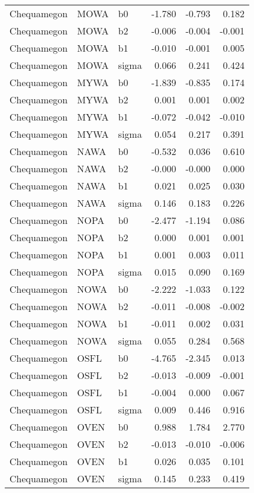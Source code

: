 \begin{table}[ht]
\begin{center}
\begin{tabular}{lllrrr}
  Chequamegon & MOWA & b0 & -1.780 & -0.793 & 0.182 \\ 
  Chequamegon & MOWA & b2 & -0.006 & -0.004 & -0.001 \\ 
  Chequamegon & MOWA & b1 & -0.010 & -0.001 & 0.005 \\ 
  Chequamegon & MOWA & sigma & 0.066 & 0.241 & 0.424 \\ 
  Chequamegon & MYWA & b0 & -1.839 & -0.835 & 0.174 \\ 
  Chequamegon & MYWA & b2 & 0.001 & 0.001 & 0.002 \\ 
  Chequamegon & MYWA & b1 & -0.072 & -0.042 & -0.010 \\ 
  Chequamegon & MYWA & sigma & 0.054 & 0.217 & 0.391 \\ 
  Chequamegon & NAWA & b0 & -0.532 & 0.036 & 0.610 \\ 
  Chequamegon & NAWA & b2 & -0.000 & -0.000 & 0.000 \\ 
  Chequamegon & NAWA & b1 & 0.021 & 0.025 & 0.030 \\ 
  Chequamegon & NAWA & sigma & 0.146 & 0.183 & 0.226 \\ 
  Chequamegon & NOPA & b0 & -2.477 & -1.194 & 0.086 \\ 
  Chequamegon & NOPA & b2 & 0.000 & 0.001 & 0.001 \\ 
  Chequamegon & NOPA & b1 & 0.001 & 0.003 & 0.011 \\ 
  Chequamegon & NOPA & sigma & 0.015 & 0.090 & 0.169 \\ 
  Chequamegon & NOWA & b0 & -2.222 & -1.033 & 0.122 \\ 
  Chequamegon & NOWA & b2 & -0.011 & -0.008 & -0.002 \\ 
  Chequamegon & NOWA & b1 & -0.011 & 0.002 & 0.031 \\ 
  Chequamegon & NOWA & sigma & 0.055 & 0.284 & 0.568 \\ 
  Chequamegon & OSFL & b0 & -4.765 & -2.345 & 0.013 \\ 
  Chequamegon & OSFL & b2 & -0.013 & -0.009 & -0.001 \\ 
  Chequamegon & OSFL & b1 & -0.004 & 0.000 & 0.067 \\ 
  Chequamegon & OSFL & sigma & 0.009 & 0.446 & 0.916 \\ 
  Chequamegon & OVEN & b0 & 0.988 & 1.784 & 2.770 \\ 
  Chequamegon & OVEN & b2 & -0.013 & -0.010 & -0.006 \\ 
  Chequamegon & OVEN & b1 & 0.026 & 0.035 & 0.101 \\ 
  Chequamegon & OVEN & sigma & 0.145 & 0.233 & 0.419 \\ 

\end{tabular}
\end{center}
\end{table}

